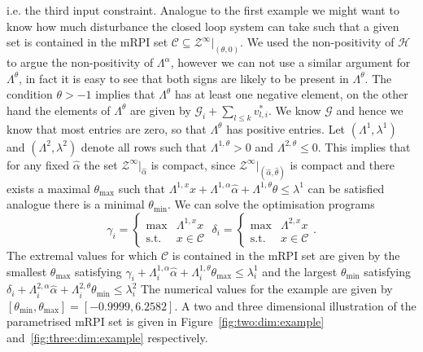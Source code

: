 \documentclass[letterpaper, 10pt, conference]{ieeeconf} %
\begin{document}
i.e. the third input constraint.
Analogue to the first example we might want to know how much disturbance the closed loop system can 
take such that a given set is contained in the mRPI set $\mathcal C\subseteq\mathcal Z^\infty\vert_{(\theta,0)}$.
We used the non-positivity of $\mathcal H$ to argue the non-positivity of $\Lambda^\alpha$, however we
can not use a similar argument for $\Lambda^\theta$, in fact it is easy to see that both signs are likely to be 
present in $\Lambda^\theta$. The condition $\theta>-1$ implies that $\Lambda^\theta$ has at least one negative
element, on the other hand the elements of $\Lambda^\theta$ are given by $\mathcal G_i + \sum_{l\leq k}v_{l,i}^\ast$.
We know $\mathcal G$ and hence we know that most entries are zero, so that $\Lambda^\theta$ has positive entries.
Let $(\Lambda^1,\lambda^1)$ and $(\Lambda^2,\lambda^2)$ denote all rows such that $\Lambda^{1,\theta}>0$ and
$\Lambda^{2,\theta}\leq0$. This implies that for any fixed $\hat\alpha$ the set $\mathcal Z^\infty\vert_{\hat\alpha}$
is compact, since $\mathcal Z^\infty\vert_{(\hat\alpha,\hat\theta)}$ is compact and there exists a maximal $\theta_{\max}$
such that $\Lambda^{1,x}x+\Lambda^{1,\alpha}\hat\alpha+\Lambda^{1,\theta}\theta\leq\lambda^1$ can be satisfied
analogue there is a minimal $\theta_{\min}$. We can solve the optimisation programs
$$
	\gamma_i = \left\{\begin{array}{rl}
	\max& \Lambda^{1,x}x\\
	\text{s.t.}& x\in\mathcal C
	\end{array}
	\right.\;
	\delta_i = \left\{\begin{array}{rl}
	\max& \Lambda^{2,x}x\\
	\text{s.t.}& x\in\mathcal C
	\end{array}
	\right. .
$$
The extremal values for which $\mathcal C$ is contained in the mRPI set are given by
the smallest $\theta_{\max}$ satisfying $\gamma_i+\Lambda^{1,\alpha}_i\hat\alpha+
\Lambda^{1,\theta}_i\theta_{\max}\leq\lambda_i^1$ and the largest $\theta_{\min}$ 
satisfying $\delta_i+\Lambda^{2,\alpha}_i\hat\alpha+\Lambda^{2,\theta}_i\theta_{\min}\leq\lambda_i^2$
The numerical values for the example are given by $[\theta_{\min},\theta_{\max}]=[-0.9999,6.2582]$.
A two and three dimensional illustration of the parametrised mRPI set is given in Figure~\ref{fig:two:dim:example}
and~\ref{fig:three:dim:example} respectively.
%
%
%
\end{document}
